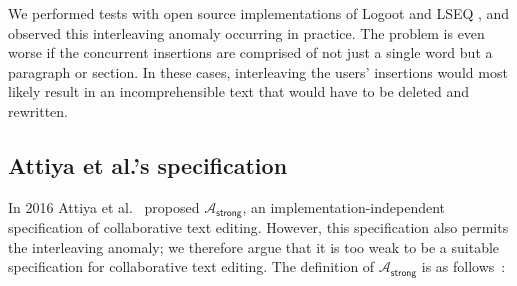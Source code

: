 \documentclass[sigconf]{acmart}
\begin{document}
We performed tests with open source implementations of Logoot \cite{AhmedNacer:2011ke,ReplicationBenchmark} and LSEQ \cite{LSEQTree,Nedelec:2016eo}, and observed this interleaving anomaly occurring in practice.
The problem is even worse if the concurrent insertions are comprised of not just a single word but a paragraph or section.
In these cases, interleaving the users' insertions would most likely result in an incomprehensible text that would have to be deleted and rewritten.


\subsection{Attiya et al.'s specification}\label{sec:attiya-spec}

In 2016 Attiya et al.~\cite{Attiya:2016kh} proposed $\mathcal{A}_\textsf{strong}$, an implementation-independent specification of collaborative text editing.
However, this specification also permits the interleaving anomaly; we therefore argue that it is too weak to be a suitable specification for collaborative text editing.
The definition of $\mathcal{A}_\textsf{strong}$ is as follows~\cite{Attiya:2016kh}:
\end{document}
